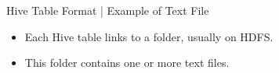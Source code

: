 \begin{frame}{Hive Table Format | Example of Text File}

	\begin{itemize}
		\item Each Hive table links to a folder, usually on HDFS. \pause
		\item This folder contains one or more text files. \pause
	  \end{itemize}
	
	\end{frame}
